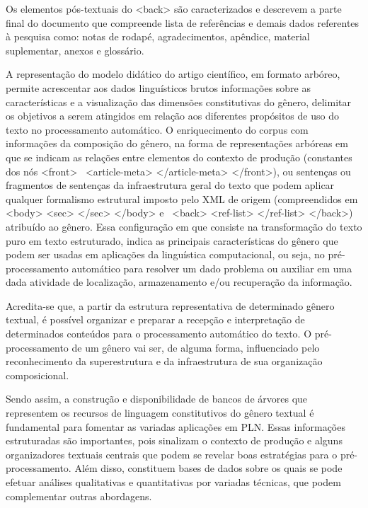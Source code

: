 \documentclass[portuguese]{textolivre}
\begin{document}
Os elementos pós-textuais do <back> são caracterizados e descrevem a parte final do documento que compreende lista de referências e demais dados referentes à pesquisa como: notas de rodapé, agradecimentos, apêndice, material suplementar, anexos e glossário.

A representação do modelo didático do artigo científico, em formato arbóreo, permite acrescentar aos dados linguísticos brutos informações sobre as características e a visualização das dimensões constitutivas do gênero, delimitar os objetivos a serem atingidos em relação aos diferentes propósitos de uso do texto no processamento automático. O enriquecimento do corpus com informações da composição do gênero, na forma de representações arbóreas em que se indicam as relações entre elementos do contexto de produção (constantes dos nós <front>  <article-meta> </article-meta> </front>), ou sentenças ou fragmentos de sentenças da infraestrutura geral do texto que podem aplicar qualquer formalismo estrutural imposto pelo XML de origem (compreendidos em <body> <sec> </sec> </body> e  <back> <ref-list> </ref-list> </back>) atribuído ao gênero.  Essa configuração em que consiste na transformação do texto puro em texto estruturado, indica as principais características do gênero que podem ser usadas em aplicações da linguística computacional, ou seja, no pré-processamento automático para resolver um dado problema ou auxiliar em uma dada atividade de localização, armazenamento e/ou recuperação da informação.

Acredita-se que, a partir da estrutura representativa de determinado gênero textual, é possível organizar e preparar a recepção e interpretação de determinados conteúdos para o processamento automático do texto. O pré-processamento de um gênero vai ser, de alguma forma, influenciado pelo reconhecimento da superestrutura e da infraestrutura de sua organização composicional.

Sendo assim, a construção e disponibilidade de bancos de árvores que representem os recursos de linguagem constitutivos do gênero textual é fundamental para fomentar as variadas aplicações em PLN. Essas informações estruturadas são importantes, pois sinalizam o contexto de produção e alguns organizadores textuais centrais que podem se revelar boas estratégias para o pré-processamento. Além disso, constituem bases de dados sobre os quais se pode efetuar análises qualitativas e quantitativas por variadas técnicas, que podem complementar outras abordagens.
\end{document}
